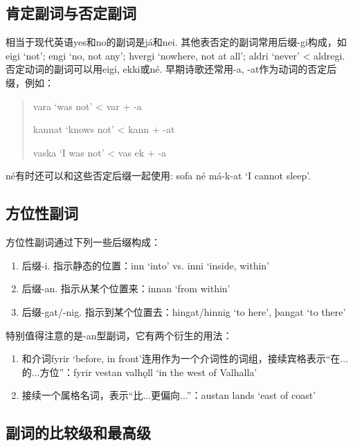 \subsection{肯定副词与否定副词}\label{肯定副词与否定副词}

相当于现代英语yes和no的副词是já和nei. 其他表否定的副词常用后缀-gi构成，如eigi `not‌'; engi `no, not any‌'; hvergi `nowhere, not at all‌'; aldri `never‌' < aldregi. 否定动词的副词可以用eigi, ekki或né. 早期诗歌还常用-a, -at作为动词的否定后缀，例如：
\begin{quote}
    vara `was not' < var + -a

    kannat `knows not' < kann + -at

    vaska `I was not‌' < vas ek + -a
\end{quote}

né有时还可以和这些否定后缀一起使用: sofa né má-k-at `I cannot sleep‌'.

\subsection{方位性副词}\label{方位性副词}

方位性副词通过下列一些后缀构成：

\begin{enumerate}
    \item
          后缀-i. 指示静态的位置：inn `into‌' vs. inni `inside, within‌'
    \item
          后缀-an. 指示从某个位置来：innan `from within‌'
    \item
          后缀-gat/-nig. 指示到某个位置去：hingat/hinnig `to here‌', þangat `to
          there‌'
\end{enumerate}


特别值得注意的是-an型副词，它有两个衍生的用法：
\begin{enumerate}
    \item 和介词fyrir `before, in front‌'连用作为一个介词性的词组，接续宾格表示“在...的...方位”：fyrir vestan
          valhǫll `in the west of Valhalla'

    \item 接续一个属格名词，表示“比...更偏向...”：austan lands `east of coast‌'
\end{enumerate}


\subsection{副词的比较级和最高级}\label{副词的比较级和最高级}

